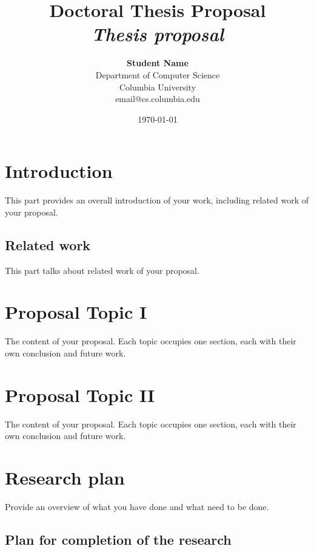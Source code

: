 \documentclass[12pt]{article}
\title{{\bf Doctoral Thesis Proposal} \\
\it Thesis proposal}
\author{ {\bf Student Name}  \\
Department of Computer Science \\
Columbia University\\
{\small email@cs.columbia.edu}
}
\date{\today}
\begin{document}
\pagestyle{plain}
\maketitle

\pagebreak
\begin{abstract}

\end{abstract}

\pagebreak
\tableofcontents
\pagebreak

\cleardoublepage
{}

\section{Introduction}
\label{ch:intro}

This part provides an overall introduction of your work, including
related work of your proposal.

\subsection{Related work}
\label{ch:related}

This part talks about related work of your proposal.

\section{Proposal Topic I} \label{sec:topic1}

The content of your proposal. Each topic occupies one section, each
with their own conclusion and future work.

\section{Proposal Topic II} \label{sec:topic2}

The content of your proposal. Each topic occupies one section, each
with their own conclusion and future work.

\section{Research plan} \label{sec:plan}

Provide an overview of what you have done and what need to be done.

\subsection{Plan for completion of the research}
\end{document}
